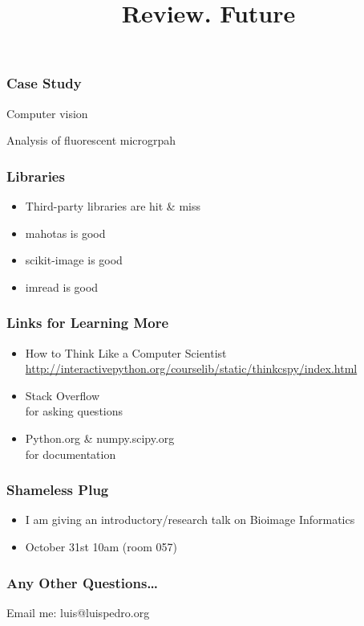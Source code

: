 
\title{Review. Future}

\frame{\maketitle}


\begin{frame}[fragile]
\frametitle{Case Study}

Computer vision

\bigskip
\bigskip

Analysis of fluorescent microgrpah

\end{frame}


\begin{frame}[fragile]
\frametitle{Libraries}

\begin{itemize}
\item Third-party libraries are hit \& miss
\item mahotas is good
\item scikit-image is good
\item imread is good
\end{itemize}

\end{frame}

\begin{frame}[fragile]
\frametitle{Links for Learning More}

\begin{itemize}
\item How to Think Like a Computer Scientist
    \url{http://interactivepython.org/courselib/static/thinkcspy/index.html}
\item Stack Overflow \\
    for asking questions
\item Python.org \& numpy.scipy.org \\
    for documentation
\end{itemize}

\end{frame}

\begin{frame}[fragile]
\frametitle{Shameless Plug}

\begin{itemize}
\item I am giving an introductory/research talk on \alert{Bioimage Informatics}
\item October 31st 10am (room 057)
\end{itemize}
\end{frame}

\begin{frame}[fragile]
\frametitle{Any Other Questions\ldots}
Email me: luis@luispedro.org
\end{frame}




